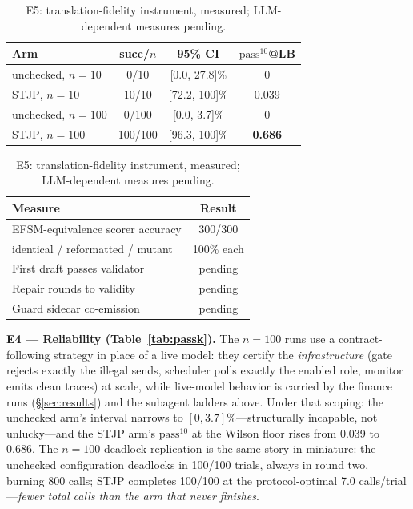 \documentclass{article}
\newcommand{\stjp}{\textsc{STJP}}
\begin{document}
\begin{table}[t]
\begin{minipage}[t]{0.53\textwidth}
\centering\small
\caption{E4, measured: reliability at $n{=}100$ (infrastructure trials; Wilson 95\% intervals). Narrowing the CI is what $n{=}100$ buys: $\mathrm{pass}^{10}$ at the CI floor rises $17.6\times$.}
\label{tab:passk}
\begin{tabular}{@{}lccc@{}}
\toprule
\textbf{Arm} & \textbf{succ/$n$} & \textbf{95\% CI} & \textbf{$\mathrm{pass}^{10}$@LB} \\
\midrule
unchecked, $n{=}10$ & 0/10 & [0.0, 27.8]\% & 0 \\
\stjp{}, $n{=}10$ & 10/10 & [72.2, 100]\% & 0.039 \\
unchecked, $n{=}100$ & 0/100 & [0.0, 3.7]\% & 0 \\
\stjp{}, $n{=}100$ & 100/100 & [96.3, 100]\% & \textbf{0.686} \\
\bottomrule
\end{tabular}
\end{minipage}\hfill
\begin{minipage}[t]{0.43\textwidth}
\centering\small
\caption{E5: translation-fidelity instrument, measured; LLM-dependent measures pending.}
\label{tab:transfid}
\begin{tabular}{@{}lc@{}}
\toprule
\textbf{Measure} & \textbf{Result} \\
\midrule
EFSM-equivalence scorer accuracy & 300/300 \\
\quad identical / reformatted / mutant & 100\% each \\
First draft passes validator & pending \\
Repair rounds to validity & pending \\
Guard sidecar co-emission & pending \\
\bottomrule
\end{tabular}
\end{minipage}
\end{table}

\textbf{E4 --- Reliability (Table~\ref{tab:passk}).} The $n{=}100$ runs use a contract-following strategy in place of a live model: they certify the \emph{infrastructure} (gate rejects exactly the illegal sends, scheduler polls exactly the enabled role, monitor emits clean traces) at scale, while live-model behavior is carried by the finance runs (\S\ref{sec:results}) and the subagent ladders above. Under that scoping: the unchecked arm's interval narrows to $[0, 3.7]\%$---structurally incapable, not unlucky---and the \stjp{} arm's $\mathrm{pass}^{10}$ at the Wilson floor rises from 0.039 to 0.686. The $n{=}100$ deadlock replication is the same story in miniature: the unchecked configuration deadlocks in 100/100 trials, always in round two, burning 800 calls; \stjp{} completes 100/100 at the protocol-optimal 7.0 calls/trial---\emph{fewer total calls than the arm that never finishes}.
\end{document}
